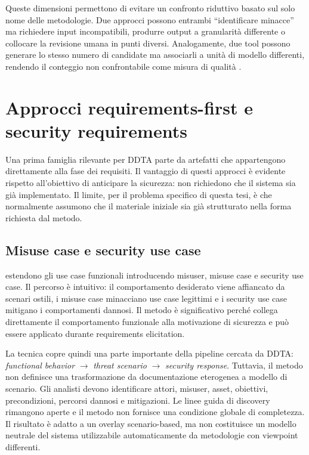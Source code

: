 \documentclass[12pt,a4paper,oneside]{report}
\begin{document}
Queste dimensioni permettono di evitare un confronto riduttivo basato sul solo nome delle metodologie. Due approcci possono entrambi ``identificare minacce'' ma richiedere input incompatibili, produrre output a granularità differente o collocare la revisione umana in punti diversi. Analogamente, due tool possono generare lo stesso numero di candidate ma associarli a unità di modello differenti, rendendo il conteggio non confrontabile come misura di qualità \citep{granata2024automatedthreatmodelling}.

\section{Approcci requirements-first e security requirements}

Una prima famiglia rilevante per DDTA parte da artefatti che appartengono direttamente alla fase dei requisiti. Il vantaggio di questi approcci è evidente rispetto all'obiettivo di anticipare la sicurezza: non richiedono che il sistema sia già implementato. Il limite, per il problema specifico di questa tesi, è che normalmente assumono che il materiale iniziale sia già strutturato nella forma richiesta dal metodo.

\subsection{Misuse case e security use case}

\citet{sindre2005eliciting} estendono gli use case funzionali introducendo misuser, misuse case e security use case. Il percorso è intuitivo: il comportamento desiderato viene affiancato da scenari ostili, i misuse case minacciano use case legittimi e i security use case mitigano i comportamenti dannosi. Il metodo è significativo perché collega direttamente il comportamento funzionale alla motivazione di sicurezza e può essere applicato durante requirements elicitation.

La tecnica copre quindi una parte importante della pipeline cercata da DDTA: \textit{functional behavior} $\rightarrow$ \textit{threat scenario} $\rightarrow$ \textit{security response}. Tuttavia, il metodo non definisce una trasformazione da documentazione eterogenea a modello di scenario. Gli analisti devono identificare attori, misuser, asset, obiettivi, precondizioni, percorsi dannosi e mitigazioni. Le linee guida di discovery rimangono aperte e il metodo non fornisce una condizione globale di completezza. Il risultato è adatto a un overlay scenario-based, ma non costituisce un modello neutrale del sistema utilizzabile automaticamente da metodologie con viewpoint differenti.
\end{document}
